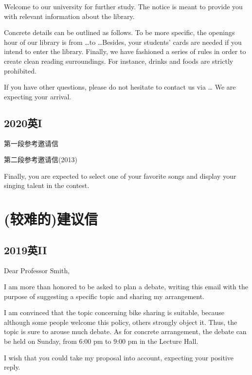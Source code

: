 Welcome to our university for further study. The notice is meant to provide you with 
relevant information about the library. 

Concrete details can be outlined as follows. To be more specific, the openings 
hour of our library is from \dots to \dots Besides, your students' cards are needed if 
you intend to enter the library. Finally, we have fashioned a series of rules in order to 
create clean reading surroundings. For instance, drinks and foods are strictly prohibited. 

If you have other questions, please do not hesitate to contact us via \dots
We are expecting your arrival. 


\section{2020英I}

第一段参考邀请信

第二段参考邀请信(2013)

Finally, you are expected to select one of your favorite songs and display your singing talent in 
the contest. 

\chapter{(较难的)建议信}

\section{2019英II}

\noindent Dear Professor Smith,

I am more than honored to be asked to plan a debate, writing this email with the 
purpose of suggesting a specific topic and sharing my arrangement.

I am convinced that the topic concerning bike sharing is suitable, because although some people 
welcome this policy, others strongly object it. Thus, the topic is sure to arouse much debate.
As for concrete arrangement, the debate can be held on Sunday, from 6:00 pm to 9:00 pm in the 
Lecture Hall. 

I wish that you could take my proposal into account, expecting your positive reply. 

\YSLM

